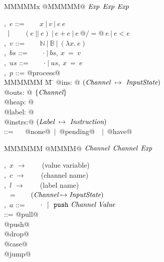 
\begin{figure}
\begin{minipage}[t]{0.4\textwidth}
\begin{tabbing}
MMMMMx \TABDEF @MMMMM@  \TABSKIP $\textit{Exp}$ \TABSKIP $\textit{Exp}$ \TABSKIP $\textit{Exp}$ \kill

\Exp,~$e$       \> ::= \> ~~~ $x~|~v~|~e~e $ \\
                \> $\enskip|~$ \> ~~ $ (e~||~e) ~|~ e+e ~|~ e~@/=@~e ~|~ e < e$ \\
\Value,~$v$     \> ::= \> ~~~ $\mathbb{N}~|~\mathbb{B}~|~(\lambda{}x.~e)$ \\
\Heap,~$bs$     \> ::= \> ~~~ $\cdot~|~bs,~x~=~v$ \\
\Updates,~$us$  \> ::= \> ~~~ $\cdot~|~us,~x~=~e$
\\[0.5em]

\Proc,~$p$      \> ::=\> @process@ \\
MMMMMM \= M \= \kill
\> \> @ins:   @  $(\textit{Channel} ~\mapsto~ \textit{InputState})$ \\
\> \> @outs:  @  $\{ \textit{Channel} \}$ \\
\> \> @heap:  @  \Heap \\
\> \> @label: @  \Label \\
\> \> @instrs:@  $(\textit{Label} ~\mapsto~ \textit{Instruction})$ 
\\[0.5em]
\InputState \> ::= \> ~~ @none@~$|$~@pending@~\Value~$|$~@have@

\end{tabbing}
\end{minipage}
\begin{minipage}[t]{0.05\textwidth}
\quad
\end{minipage}
\begin{minipage}[t]{0.4\textwidth}
\begin{tabbing}
MMMMMM \TABDEF @MMMM@  \TABSKIP $\textit{Channel}$ \TABSKIP $\textit{Channel}$ \TABSKIP $\textit{Exp}$ \kill

\Var,~$x$       \> $\to$ \> ~~~ (value variable) \\
\Chan,~$c$      \> $\to$ \> ~~~ (channel name) \\
\Label,~$l$     \> $\to$ \> ~~~ (label name) \\ 
\ChannelStates  \> ~ =   \> ~~~ $(\textit{Channel} \mapsto \textit{InputState})$ \\
\Action,~$a$   \> ::=    \> ~~~ $\cdot ~~|~~ \texttt{push}~\textit{Channel}~\textit{Value}$ \\[0.5em]

\Instr
    \> ::=\> @pull@  \> \Chan  \> \Var  \> \Next \\
    \TABALT  @push@  \> \Chan  \> \Exp  \> \Next \\
    \TABALT  @drop@  \> \Chan  \>       \> \Next \\
    \TABALT  @case@  \> \Exp   \> \Next \> \Next \\
    \TABALT  @jump@  \>        \>       \> \Next \\
\\[0.5em]


\end{tabbing}
\end{minipage}
\end{figure}
